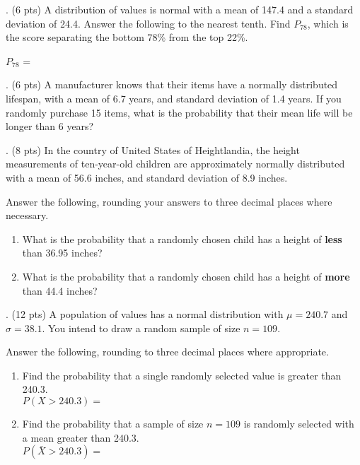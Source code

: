 \documentclass{article}
\newcommand{\newquestion}{\vspace{4mm} \noindent}
\begin{document}
\newquestion
9. (6 pts) A distribution of values is normal with a mean of 147.4 and a standard deviation of 24.4. Answer the following to the nearest tenth. Find $P_{78}$, which is the score separating the bottom 78\% from the top 22\%.
\vspace{4mm}

\hspace{8mm} $P_{78}$ =
\vspace{35mm}

\pagebreak

\newquestion
10. (6 pts) A manufacturer knows that their items have a normally distributed lifespan, with a mean of 6.7 years, and standard deviation of 1.4 years. If you randomly purchase 15 items, what is the probability that their mean life will be longer than 6 years?
\vspace{40mm}

\newquestion
11. (8 pts) In the country of United States of Heightlandia, the height measurements of ten-year-old children are approximately normally distributed with a mean of 56.6 inches, and standard deviation of 8.9 inches.\\ \vspace{4mm}

Answer the following, rounding your answers to three decimal places where necessary.

\begin{enumerate}[label=\alph*.]
\item
  What is the probability that a randomly chosen child has a height of
  \textbf{less} than 36.95 inches?\\ \vspace{20mm}
\item
  What is the probability that a randomly chosen child has a height of
  \textbf{more} than 44.4 inches?\\ \vspace{20mm}
\end{enumerate}

\newquestion
12. (12 pts) A population of values has a normal distribution with \(\mu = 240.7\) and \(\sigma = 38.1\). You intend to draw a random sample of size \(n = 109\).

Answer the following, rounding to three decimal places where appropriate.

\begin{enumerate}[label=\alph*.]
\item
Find the probability that a single randomly selected value is greater
than 240.3.\\
$P(X > 240.3) = $
\vspace{30mm}

\item
Find the probability that a sample of size \(n = 109\) is randomly
selected with a mean greater than 240.3.\\
$P(\bar{X} > 240.3) = $
\vspace{30mm}

\end{enumerate}
\end{document}
